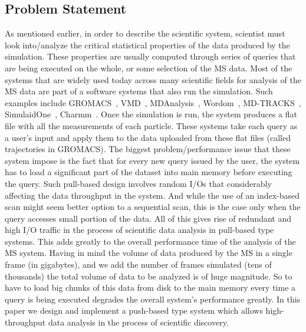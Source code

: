 \documentclass[10pt,journal,final,letterpaper,twocolumn]{IEEEtran}
\begin{document}
\subsection{Problem Statement}
As mentioned earlier, in order to describe the scientific system,
scientist must look into/analyze the critical statistical properties
of the data produced by the simulation. These properties are usually
computed through series of queries that are being executed on the
whole, or some selection of the MS data. Most of the systems that
are widely used today across many scientific fields for analysis of
the MS data are part of a software systems that also run the
simulation. Such examples include GROMACS~\cite{GROMACS4},
VMD~\cite{VMD}, MDAnalysis~\cite{MDAnalysis}, Wordom~\cite{wordom},
MD-TRACKS~\cite{MDtracks}, SimulaidOne~\cite{Simulaid},
Charmm~\cite{CHARMM}. Once the simulation is run, the system
produces a flat file with all the measurements of each particle.
These systems take each query as a user's input and apply them to
the data uploaded from these flat files (called trajectories in
GROMACS). The biggest problem/performance issue that these system
impose is the fact that for every new query issued by the user, the
system has to load a significant part of the dataset into main
memory before executing the query. Such pull-based design involves
random I/Os that considerably affecting the data throughput in the
system. And while the use of an index-based scan might seem better
option to a sequential scan, this is the case only when the query
accesses small portion of the data. All of this gives rise of
redundant and high I/O traffic in the process of scientific data
analysis in pull-based type systems. This adds greatly to the
overall performance time of the analysis of the MS system. Having in
mind the volume of data produced by the MS in a single frame (in
gigabytes), and we add the number of frames simulated (tens of
thousands) the total volume of data to be analyzed is of huge
magnitude. So to have to load big chunks of this data from disk to
the main memory every time a query is being executed degrades the
overall system's performance greatly. In this paper we design and
implement a push-based type system which allows high-throughput data
analysis in the process of scientific discovery.
\end{document}
